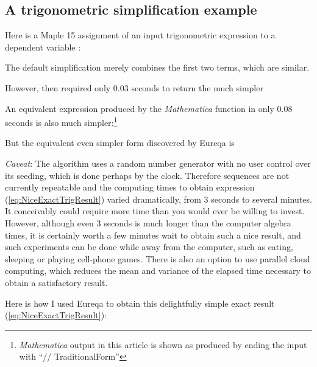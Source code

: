 \documentclass[12pt,english]{article}
\begin{document}
\subsection{A trigonometric simplification example\label{sub:A-trigonometric-simplificationEg}}

Here is a Maple 15 assignment of an input trigonometric expression
to a dependent variable :\vspace{-5pt}

The default simplification merely combines the first two terms, which
are similar.

However, then  required only 0.03 seconds to
return the much simpler\vspace{-5pt}

An equivalent expression produced by the \textsl{Mathematica} 
function in only 0.08 seconds is also much simpler:\footnote{\textsl{Mathematica} output in this article is shown as produced by
ending the input with {}``// TraditionalForm''}\vspace{-5pt}

But the equivalent even simpler form discovered by Eureqa is\vspace{-5pt}

\textsl{Caveat}: The algorithm uses a random number generator with
no user control over its seeding, which is done perhaps by the clock.
Therefore sequences are not currently repeatable and the computing
times to obtain expression (\ref{eq:NiceExactTrigResult}) varied
dramatically, from 3 seconds to several minutes. It conceivably could
require more time than you would ever be willing to invest. However,
although even 3 seconds is much longer than the computer algebra times,
it is certainly worth a few minutes wait to obtain such a nice result,
and such experiments can be done while away from the computer, such
as eating, sleeping or playing cell-phone games. There is also an
option to use parallel cloud computing, which reduces the mean and
variance of the elapsed time necessary to obtain a satisfactory result.

Here is how I used Eureqa to obtain this delightfully simple exact
result (\ref{eq:NiceExactTrigResult}):\vspace{-5pt}
\end{document}
